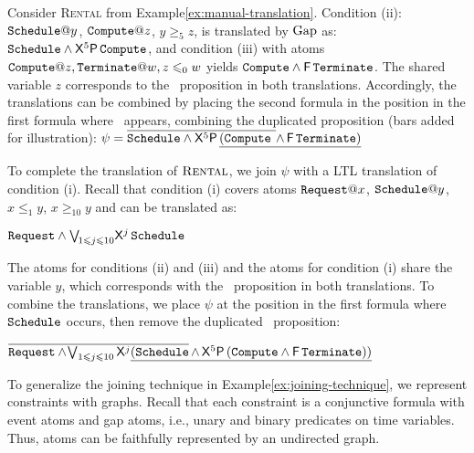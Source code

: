 \begin{examp}\label{ex:joining-technique}
  Consider \textsc{Rental} from Example\:\ref{ex:manual-translation}.
  Condition (ii): 
  $\Schedule@y$, $\Compute@z$, $y\geq_{5}z$,
  is translated by $\text{Gap}$ as:
  $\texttt{Schedule}\land{\sf X}^5{\sf P}\,\mbox{{\tt Compute}}$,
  and condition (iii) with atoms
  $\Compute@z,\Terminate@w,z\leq_{0}w$
  yields $\mbox{{\tt Compute}}\land{\sf F}\,\texttt{Terminate}$.
  The shared variable $z$ corresponds to the \Compute\ proposition
  in both translations.
  Accordingly, the translations can be combined
  by placing the second formula
  in the position in the first formula
  where \Compute\ appears,
  combining the duplicated proposition (bars added for illustration):
  {\centering
  $
    \psi=\overline{\texttt{Schedule}\land{\sf X}^5{\sf P}\,
      \underline{(\mbox{{\tt Compute}}^{\ }}}\underline{\land\,{\sf F}\,\texttt{Terminate})}
  $
  }

  To complete the translation of $\textsc{Rental}$,
  we join $\psi$
  with a LTL translation of condition (i).
  Recall that condition (i) covers atoms
  $\Request@x$, $\Schedule@y$, $x\leq_{1}y$, $x\geq_{10}y$
  and can be translated as:
  
  \begin{center}
  $\texttt{Request}\land{\bigvee}_{\!1\leqslant j\leqslant 10}{\sf X}^j\,\texttt{Schedule}$
  \end{center}

  The atoms for conditions (ii) and (iii)
  and the atoms for condition (i) share the variable $y$,
  which corresponds with the \Schedule\ proposition
  in both translations.
  To combine the translations,
  we place $\psi$
  at the position in the first formula where $\texttt{Schedule}$ occurs,
  then remove the duplicated \Schedule\ proposition:

  \begin{center}
  $
  \overline{\texttt{Request}\land\!\bigvee_{1\leqslant j\leqslant 10}{\sf X}^j
  \underline{(\texttt{Schedule}}}
  \underline{\,{\land}\,{\sf X}^5{\sf P}\,(\mbox{{\tt Compute}}\land{\sf F}\,\texttt{Terminate}))}
  $
  \vspace{-2.5em}
  \end{center}
\end{examp}
  
To generalize the
joining technique in Example\:\ref{ex:joining-technique},
we represent constraints with graphs.
Recall that each constraint is a conjunctive formula
with event atoms and gap atoms,
i.e., unary and binary predicates on time variables.
Thus, atoms
can be faithfully represented by an undirected graph.

